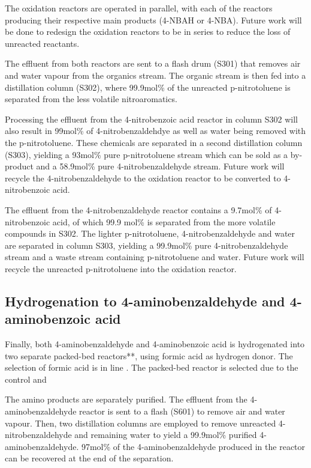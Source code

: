 The oxidation reactors are operated in parallel, with each of the reactors producing their respective main products (4-NBAH or 4-NBA). Future work will be done to redesign the oxidation reactors to be in series to reduce the loss of unreacted reactants.

The effluent from both reactors are sent to a flash drum (S301) that removes air and water vapour from the organics stream. The organic stream is then fed into a distillation column (S302), where 99.9mol\% of the unreacted p-nitrotoluene is separated from the less volatile nitroaromatics. 

Processing the effluent from the 4-nitrobenzoic acid reactor in column S302 will also result in 99mol\% of 4-nitrobenzaldehdye as well as water being removed with the p-nitrotoluene. These chemicals are separated in a second distillation column (S303), yielding a 93mol\% pure p-nitrotoluene stream which can be sold as a by-product and a 58.9mol\% pure 4-nitrobenzaldehyde stream. Future work will recycle the 4-nitrobenzaldehyde to the oxidation reactor to be converted to 4-nitrobenzoic acid.

The effluent from the 4-nitrobenzaldehyde reactor contains a 9.7mol\% of 4-nitrobenzoic acid, of which 99.9 mol\% is separated from the more volatile compounds in S302. The lighter p-nitrotoluene,  4-nitrobenzaldehyde and water are separated in column S303, yielding a 99.9mol\% pure 4-nitrobenzaldehyde stream and a waste stream containing p-nitrotoluene and water. Future work will recycle the unreacted p-nitrotoluene into the oxidation reactor.

\subsection{Hydrogenation to 4-aminobenzaldehyde and 4-aminobenzoic acid}

Finally, both 4-aminobenzaldehyde and 4-aminobenzoic acid is hydrogenated into two separate packed-bed reactors**, using formic acid as hydrogen donor. The selection of formic acid is in line . The packed-bed reactor is selected due to the control and 

The amino products are separately purified. The effluent from the 4-aminobenzaldehyde reactor is sent to a flash (S601) to remove air and water vapour.  Then, two distillation columns are employed to remove unreacted 4-nitrobenzaldehyde and remaining water to yield a 99.9mol\% purified 4-aminobenzaldehyde. 97mol\% of the 4-aminobenzaldehyde produced in the reactor can be recovered at the end of the separation.

